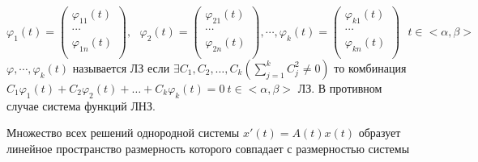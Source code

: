 \begin{define}
  $$
  \varphi_1 (t) =
  \left(
  \begin{array}{c}
    \varphi_{11}(t) \\
    \cdots \\
    \varphi_{1n}(t) \\
  \end{array}
  \right),~~~
  \varphi_2 (t) =
  \left(
  \begin{array}{c}
    \varphi_{21}(t) \\
    \cdots \\
    \varphi_{2n}(t) \\
  \end{array}
  \right), \cdots,
  \varphi_k (t) =
  \left(
  \begin{array}{c}
    \varphi_{k1}(t) \\
    \cdots \\
    \varphi_{kn}(t) \\
  \end{array}
  \right) ~~~ t \in <\alpha, \beta>
  $$
  $\varphi, \cdots, \varphi_k(t)$ называется ЛЗ если $\exists C_1, C_2, \ldots,
  C_k(\sum_{j=1}^k C_j^2 \not= 0)$ то комбинация $C_1\varphi_1(t) +
  C_2\varphi_2(t) + \ldots + C_k\varphi_k(t) = 0 ~ t \in <\alpha, \beta>$ ЛЗ. В
  противном случае система функций ЛНЗ.
\end{define}

\begin{theorem}
  Множество всех решений однородной системы $x'(t) = A(t)x(t)$ образует
  линейное пространство размерность которого совпадает с размерностью системы
\end{theorem}

